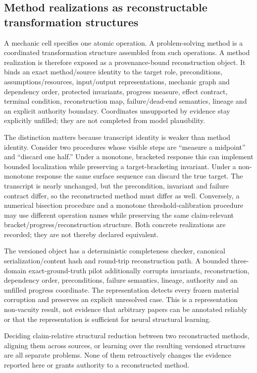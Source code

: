 \subsection{Method realizations as reconstructable transformation structures}

A mechanic cell specifies one atomic operation. A problem-solving method is a coordinated transformation structure assembled from such operations. A method realization is therefore exposed as a provenance-bound reconstruction object. It binds an exact method/source identity to the target role, preconditions, assumptions/resources, input/output representations, mechanic graph and dependency order, protected invariants, progress measure, effect contract, terminal condition, reconstruction map, failure/dead-end semantics, lineage and an explicit authority boundary. Coordinates unsupported by evidence stay explicitly unfilled; they are not completed from model plausibility.

The distinction matters because transcript identity is weaker than method identity. Consider two procedures whose visible steps are ``measure a midpoint'' and ``discard one half.'' Under a monotone, bracketed response this can implement bounded localization while preserving a target-bracketing invariant. Under a non-monotone response the same surface sequence can discard the true target. The transcript is nearly unchanged, but the precondition, invariant and failure contract differ, so the reconstructed method must differ as well. Conversely, a numerical bisection procedure and a monotone threshold-calibration procedure may use different operation names while preserving the same claim-relevant bracket/progress/reconstruction structure. Both concrete realizations are recorded; they are not thereby declared equivalent.

The versioned object has a deterministic completeness checker, canonical serialization/content hash and round-trip reconstruction path. A bounded three-domain exact-ground-truth pilot additionally corrupts invariants, reconstruction, dependency order, preconditions, failure semantics, lineage, authority and an unfilled progress coordinate. The representation detects every frozen material corruption and preserves an explicit unresolved case. This is a representation non-vacuity result, not evidence that arbitrary papers can be annotated reliably or that the representation is sufficient for neural structural learning.

Deciding claim-relative structural reduction between two reconstructed methods, aligning them across sources, or learning over the resulting versioned structures are all separate problems. None of them retroactively changes the evidence reported here or grants authority to a reconstructed method.

